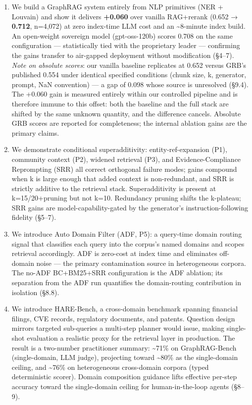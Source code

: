 \begin{enumerate}
\def\labelenumi{\arabic{enumi}.}
\tightlist
\item
  We build a GraphRAG system entirely from NLP primitives (NER + Louvain) and show it delivers \textbf{+0.060} over vanilla RAG+rerank (0.652 → \textbf{0.712}, n=4,072) at zero index-time LLM cost and an \textasciitilde8-minute index build. An open-weight sovereign model (gpt-oss-120b) scores 0.708 on the same configuration --- statistically tied with the proprietary leader --- confirming the gains transfer to air-gapped deployment without modification (§4--7). \emph{Note on absolute scores}: our vanilla baseline replicates at 0.652 versus GRB's published 0.554 under identical specified conditions (chunk size, k, generator, prompt, NaN convention) --- a gap of 0.098 whose source is unresolved (§9.4). The +0.060 gain is measured entirely within our controlled pipeline and is therefore immune to this offset: both the baseline and the full stack are shifted by the same unknown quantity, and the difference cancels. Absolute GRB scores are reported for completeness; the internal ablation gains are the primary claims.
\item
  We demonstrate conditional superadditivity: entity-ref-expansion (P1), community context (P2), widened retrieval (P3), and Evidence-Compliance Reprompting (SRR) all correct orthogonal failure modes; gains compound when k is large enough that added context is non-redundant, and SRR is strictly additive to the retrieval stack. Superadditivity is present at k=15/20+pruning but not k=10. Redundancy pruning shifts the k-plateau; SRR gains are model-capability-gated by the generator's instruction-following fidelity (§5--7).
\item
  We introduce Auto Domain Filter (ADF, P5): a query-time domain routing signal that classifies each query into the corpus's named domains and scopes retrieval accordingly. ADF is zero-cost at index time and eliminates off-domain noise --- the primary contamination source in heterogeneous corpora. The no-ADF BC+BM25+SRR configuration is the ADF ablation; its separation from the ADF run quantifies the domain-routing contribution in isolation (§8.8).
\item
  We introduce HARE-Bench, a cross-domain benchmark spanning financial filings, CVE records, regulatory documents, and patents. Question design mirrors targeted sub-queries a multi-step planner would issue, making single-shot evaluation a realistic proxy for the retrieval layer in production. The result is a two-number practitioner summary: \textasciitilde71\% on GraphRAG-Bench (single-domain, LLM judge), projecting toward \textasciitilde80\% as the single-domain ceiling, and \textasciitilde76\% on heterogeneous cross-domain corpora (typed deterministic scorer). Domain composition guidance lifts effective per-step accuracy toward the single-domain ceiling for human-in-the-loop agents (§8--9).

\end{enumerate}
